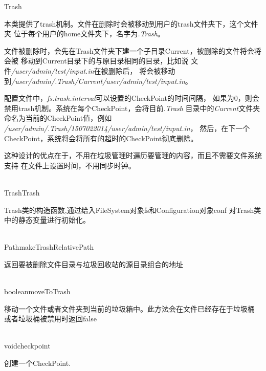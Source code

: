 \begin{XeClass}{Trash}
   
 本类提供了trash机制。文件在删除时会被移动到用户的trash文件夹下，这个文件夹
 位于每个用户的home文件夹下，名字为\emph{.Trash}。
 
 文件被删除时，会先在Trash文件夹下建一个子目录Current，被删除的文件将会将会被
 移动到Current目录下的与原目录相同的目录，比如说
 文件\emph{/user/admin/test/input.in}在被删除后，
 将会被移动到\emph{/user/admin/.Trash/Current/user/admin/test/input.in}。
 
 配置文件中，\emph{fs.trash.interval}可以设置的CheckPoint的时间间隔，
 如果为0，则会禁用trash机制。系统在每个CheckPoint，会将目前\emph{.Trash}
 目录中的\emph{Current}文件夹命名为当前的CheckPoint值，例如
 \emph{/user/admin/.Trash/1507022014/user/admin/test/input.in}，
 然后，在下一个CheckPoint，系统将会将所有的超时的CheckPoint彻底删除。
 
 这种设计的优点在于，不用在垃圾管理时遍历要管理的内容，而且不需要文件系统支持
 在文件上设置时间，不用同步时钟。

  \begin{XeMethod}{\XePublic\\ }{Trash}{Trash}
       
 Trash类的构造函数,通过给入FileSystem对象fs和Configuration对象conf
 对Trash类中的静态变量进行初始化。

  \end{XeMethod}

  \begin{XeMethod}{\XePrivate\\ }{Path}{makeTrashRelativePath}
       
 返回要被删除文件目录与垃圾回收站的源目录组合的地址

  \end{XeMethod}

  \begin{XeMethod}{\XePublic\\ }{boolean}{moveToTrash}
       
 移动一个文件或者文件夹到当前的垃圾箱中。此方法会在文件已经存在于垃圾桶
 或者垃圾桶被禁用时返回false

  \end{XeMethod}

  \begin{XeMethod}{\XePublic\\ }{void}{checkpoint}
       
 创建一个CheckPoint.


\end{XeMethod}
\end{XeClass}
